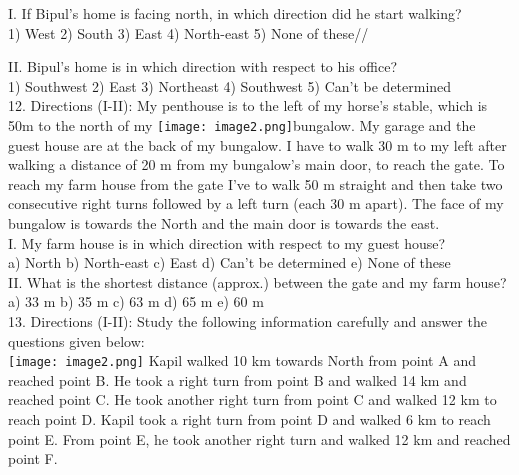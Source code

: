 \documentclass[
]{article}
\begin{document}
I. If Bipul's home is facing north, in which direction did he start walking?\\
1) West \hspace{2mm}2) South \hspace{2mm}3) East \hspace{2mm}4) North-east \hspace{2mm}5) None of these//

II. Bipul's home is in which direction with respect to his office?\\
1) Southwest \hspace{2mm}2) East \hspace{2mm}3) Northeast
\hspace{2mm}4) Southwest \hspace{2mm}5) Can't be determined\\

12. Directions (I-II): My penthouse is to the left of my horse’s stable, which is 50m to the north of my \texttt{[image: image2.png]}bungalow. My garage and the guest house are at the back of my bungalow. I have to walk 30 m to my left after walking a distance of 20 m from my bungalow's main door, to reach the gate. To reach my farm house from the gate I’ve to walk 50 m straight and then take two consecutive right turns followed by a left turn (each 30 m apart). The face of my bungalow is towards the North and the main door is towards the east.\\

I. My farm house is in which direction with respect to my guest house?\\
a) North \hspace{2mm}b) North-east \hspace{2mm}c) East
\hspace{2mm}d) Can’t be determined \hspace{2mm}e) None of these\\

II. What is the shortest distance (approx.) between the gate and my farm house?\\
a) 33 m \hspace{2mm}b) 35 m \hspace{2mm}c) 63 m \hspace{2mm}d) 65 m \hspace{2mm}e) 60 m\\

13. Directions (I-II): Study the following information carefully and answer the questions given
below:\\
\texttt{[image: image2.png]}
Kapil walked 10 km towards North from point A and reached point B. He took a right turn
from point B and walked 14 km and reached point C. He took another right turn from point
C and walked 12 km to reach point D. Kapil took a right turn from point D and walked 6 km
to reach point E. From point E, he took another right turn and walked 12 km and reached
point F.\\
\end{document}
